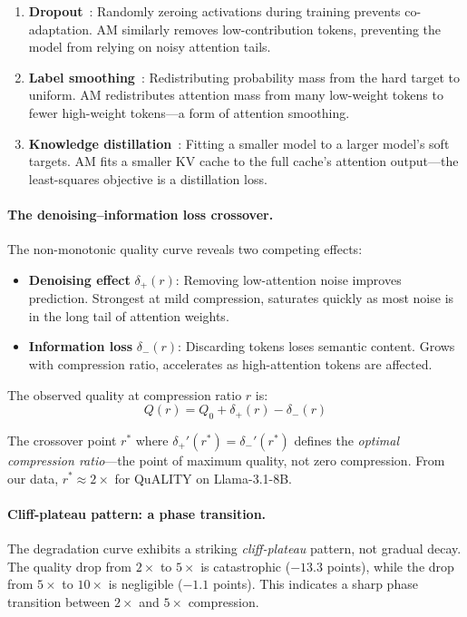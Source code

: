 \begin{enumerate}
    \item \textbf{Dropout}~\citep{srivastava2014dropout}: Randomly zeroing activations during training prevents co-adaptation. AM similarly removes low-contribution tokens, preventing the model from relying on noisy attention tails.
    \item \textbf{Label smoothing}~\citep{szegedy2016}: Redistributing probability mass from the hard target to uniform. AM redistributes attention mass from many low-weight tokens to fewer high-weight tokens---a form of attention smoothing.
    \item \textbf{Knowledge distillation}~\citep{hinton2015}: Fitting a smaller model to a larger model's soft targets. AM fits a smaller KV cache to the full cache's attention output---the least-squares objective is a distillation loss.
\end{enumerate}

\paragraph{The denoising--information loss crossover.}
The non-monotonic quality curve reveals two competing effects:

\begin{itemize}
    \item \textbf{Denoising effect} $\delta_+(r)$: Removing low-attention noise improves prediction. Strongest at mild compression, saturates quickly as most noise is in the long tail of attention weights.
    \item \textbf{Information loss} $\delta_-(r)$: Discarding tokens loses semantic content. Grows with compression ratio, accelerates as high-attention tokens are affected.
\end{itemize}

The observed quality at compression ratio $r$ is:
\begin{equation}
    Q(r) = Q_0 + \delta_+(r) - \delta_-(r)
    \label{eq:quality-curve}
\end{equation}

The crossover point $r^*$ where $\delta_+'(r^*) = \delta_-'(r^*)$ defines the \emph{optimal compression ratio}---the point of maximum quality, not zero compression. From our data, $r^* \approx 2\times$ for QuALITY on Llama-3.1-8B.

\paragraph{Cliff-plateau pattern: a phase transition.}
The degradation curve exhibits a striking \emph{cliff-plateau} pattern, not gradual decay. The quality drop from $2\times$ to $5\times$ is catastrophic ($-13.3$ points), while the drop from $5\times$ to $10\times$ is negligible ($-1.1$ points). This indicates a sharp phase transition between $2\times$ and $5\times$ compression.

